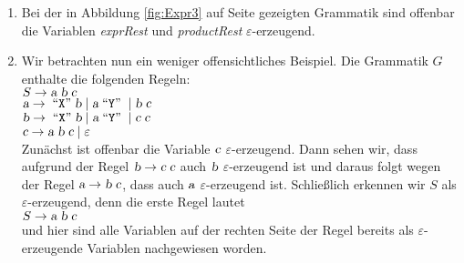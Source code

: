 \examples
\begin{enumerate}
\item Bei der in Abbildung \ref{fig:Expr3} auf Seite \pageref{fig:Expr3} gezeigten Grammatik
      sind offenbar die Variablen \textsl{exprRest} und \textsl{productRest} $\varepsilon$-erzeugend.
\item Wir betrachten nun ein weniger offensichtliches Beispiel.  Die Grammatik $G$
      enthalte die folgenden Regeln:
      \\[0.2cm]
      \hspace*{1.3cm}
      $S \rightarrow \textsl{a} \; \textsl{b} \; \textsl{c}$
      \\[0.2cm]
      \hspace*{1.3cm}
      $\textsl{a} \rightarrow \;\mbox{``\texttt{X}''}\; \textsl{b} \mid \textsl{a} \;\mbox{``\texttt{Y}''}\; \mid \textsl{b}\;\textsl{c}$
      \\[0.2cm]
      \hspace*{1.3cm}
      $\textsl{b} \rightarrow \;\mbox{``\texttt{X}''}\; \textsl{b} \mid \textsl{a} \;\mbox{``\texttt{Y}''}\; \mid \textsl{c}\;\textsl{c}$
      \\[0.2cm]
      \hspace*{1.3cm}
      $\textsl{c} \rightarrow \textsl{a}\;\textsl{b}\; \textsl{c} \mid \varepsilon$
      \\[0.2cm]
      Zun\"achst ist offenbar die Variable $\textsl{c}$ $\varepsilon$-erzeugend.  Dann sehen wir,
      dass aufgrund der Regel $\textsl{b} \rightarrow \textsl{c} \;\textsl{c}$ auch $\textsl{b}$ $\varepsilon$-erzeugend ist
      und daraus folgt wegen der Regel $\textsl{a} \rightarrow \textsl{b}\;\textsl{c}$, dass auch $\textsl{a}$
      $\varepsilon$-erzeugend ist.  Schlie{\ss}lich erkennen wir $S$ als $\varepsilon$-erzeugend,
      denn die erste Regel lautet
      \\[0.2cm]
      \hspace*{1.3cm}
      $S \rightarrow \textsl{a} \; \textsl{b} \; \textsl{c}$
      \\[0.2cm]
      und hier sind alle Variablen auf der rechten Seite der Regel bereits als
      $\varepsilon$-erzeugende Variablen nachgewiesen worden.
\end{enumerate}
 
